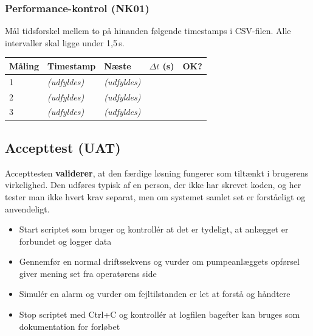 \documentclass[12pt, a4paper]{article}
\begin{document}
\vspace{0.5cm}

\subsubsection{Performance-kontrol (NK01)}

Mål tidsforskel mellem to på hinanden følgende timestamps i CSV-filen.
Alle intervaller skal ligge under 1{,}5\,s.

\begin{center}
\begin{tabular}{lllll}
\toprule
\textbf{Måling} & \textbf{Timestamp} & \textbf{Næste} & \textbf{$\Delta t$ (s)} & \textbf{OK?} \\
\midrule
1 & \textit{(udfyldes)} & \textit{(udfyldes)} & & \\
2 & \textit{(udfyldes)} & \textit{(udfyldes)} & & \\
3 & \textit{(udfyldes)} & \textit{(udfyldes)} & & \\
\bottomrule
\end{tabular}
\end{center}

\subsection{Accepttest (UAT)}

\begin{tcolorbox}[defbox, title={\faUserCircle\quad Accepttest --- brugerens perspektiv}]
Accepttesten \textbf{validerer}, at den færdige løsning fungerer som tiltænkt i
brugerens virkelighed.
Den udføres typisk af en person, der ikke har skrevet koden, og her tester man
ikke hvert krav separat, men om systemet samlet set er forståeligt og anvendeligt.

\vspace{6pt}
\begin{itemize}[leftmargin=1.2em, itemsep=4pt]
  \item[\textcolor{accentblue}{\faCheckSquare}]
    Start scriptet som bruger og kontrollér at det er tydeligt, at anlægget er
    forbundet og logger data
  \item[\textcolor{accentblue}{\faCheckSquare}]
    Gennemfør en normal driftssekvens og vurder om pumpeanlæggets opførsel giver
    mening set fra operatørens side
  \item[\textcolor{accentblue}{\faCheckSquare}]
    Simulér en alarm og vurder om fejltilstanden er let at forstå og håndtere
  \item[\textcolor{accentblue}{\faCheckSquare}]
    Stop scriptet med Ctrl+C og kontrollér at logfilen bagefter kan bruges som
    dokumentation for forløbet
\end{itemize}
\end{tcolorbox}
\end{document}
